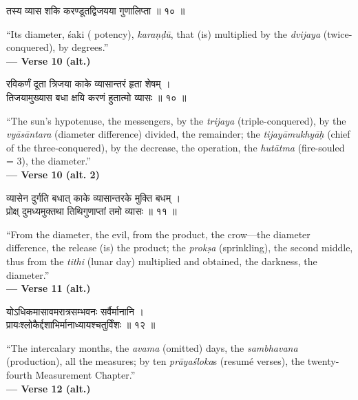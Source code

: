\documentclass[11pt,a4paper]{article}
\newcommand{\dev}[1]{{\devanagarifont #1}}
\newenvironment{bilingualverse}{%
  \begin{paracol}{2}
  \fontsize{10.5}{13}\selectfont
}{%
  \end{paracol}
  \vspace{0.3cm}
}
\newenvironment{paracol}[1]{\begingroup}{\endgroup}
\newenvironment{leftcolumn*}{\begingroup}{\endgroup}
\newenvironment{rightcolumn}{\begingroup}{\endgroup}
\begin{document}
\begin{bilingualverse}
\begin{leftcolumn*}
\dev{तस्य व्यास शकि करण्डूतद्विजयया गुणालिप्ता ॥ १० ॥}
\end{leftcolumn*}
\begin{rightcolumn}
``Its diameter, śaki ( potency), \textit{karaṇḍū}, that (is) multiplied by the \textit{dvijaya} (twice-conquered), by degrees.''\\[0.3cm]
\hfill\textbf{— Verse 10 (alt.)}
\end{rightcolumn}
\end{bilingualverse}

\begin{bilingualverse}
\begin{leftcolumn*}
\dev{रविकर्णं दूता त्रिजया काके व्यासान्तरं हृता शेषम् ।}\\
\dev{तिजयामुख्यास बधा क्षयि करणं हुतात्मो व्यासः ॥ १० ॥}
\end{leftcolumn*}
\begin{rightcolumn}
``The sun's hypotenuse, the messengers, by the \textit{trijaya} (triple-conquered), by the \textit{vyāsāntara} (diameter difference) divided, the remainder; the \textit{tijayāmukhyāḥ} (chief of the three-conquered), by the decrease, the operation, the \textit{hutātma} (fire-souled = 3), the diameter.''\\[0.3cm]
\hfill\textbf{— Verse 10 (alt. 2)}
\end{rightcolumn}
\end{bilingualverse}

\begin{bilingualverse}
\begin{leftcolumn*}
\dev{व्यासेन दुर्गति बधात् काके व्यासान्तरके मुक्ति बधम् ।}\\
\dev{प्रोक्ष् दुमध्यमुक्तथा तिथिगुणाप्तां तमो व्यासः ॥ ११ ॥}
\end{leftcolumn*}
\begin{rightcolumn}
``From the diameter, the evil, from the product, the crow---the diameter difference, the release (is) the product; the \textit{prokṣa} (sprinkling), the second middle, thus from the \textit{tithi} (lunar day) multiplied and obtained, the darkness, the diameter.''\\[0.3cm]
\hfill\textbf{— Verse 11 (alt.)}
\end{rightcolumn}
\end{bilingualverse}

\begin{bilingualverse}
\begin{leftcolumn*}
\dev{योऽधिकमासावमरात्रसम्भवनः सर्वैर्मानानि ।}\\
\dev{प्रायःश्लोकैर्द्दशाभिर्मानाध्यायश्चतुर्विंशः ॥ १२ ॥}
\end{leftcolumn*}
\begin{rightcolumn}
``The intercalary months, the \textit{avama} (omitted) days, the \textit{sambhavana} (production), all the measures; by ten \textit{prāyaśloka}s (resumé verses), the twenty-fourth Measurement Chapter.''\\[0.3cm]
\hfill\textbf{— Verse 12 (alt.)}
\end{rightcolumn}
\end{bilingualverse}
\end{document}

